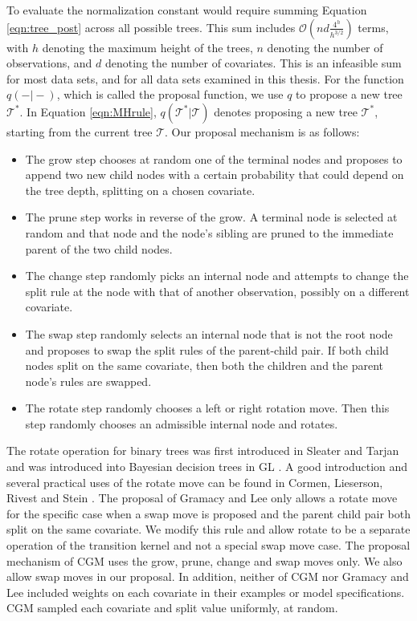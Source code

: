 To evaluate the normalization constant would require summing Equation \ref{eqn:tree_post} across all possible trees. This sum includes $\mathcal{O}(nd\frac{4^h}{h^{3/2}})$ terms, with $h$ denoting the maximum height of the trees, $n$ denoting the number of observations, and $d$ denoting the number of covariates. This is an infeasible sum for most data sets, and for all data sets examined in this thesis. For the function $q(-\vert-)$, which is called the proposal function, we use $q$ to propose a new tree $\mathcal{T}^*$.   
In Equation \ref{eqn:MHrule}, $q(\mathcal{T}^*\vert\mathcal{T})$ denotes proposing a new tree $\mathcal{T}^*$, starting from the current tree $\mathcal{T}$. 
 Our proposal mechanism is as follows:
  \begin{itemize}
 \item The grow step chooses at random one of the terminal nodes and proposes to append two new child nodes with a certain probability that could depend on the tree depth, splitting on a chosen covariate.
 \item The prune step works in reverse of the grow. A terminal node is selected at random and that node and the node's sibling are pruned to the immediate parent of the two child nodes.
 \item The change step randomly picks an internal node and attempts to change the split rule at the node with that of another observation, possibly on a different covariate.
  \item The swap step randomly selects an internal node that is not the root node and proposes to swap the split rules of the parent-child pair. If both child nodes split on the same covariate, then both the children and the parent node's rules are swapped.
  \item The rotate step randomly chooses a left or right rotation move. Then this step randomly chooses an admissible internal node and rotates.
 \end{itemize}
  The rotate operation for binary trees was first introduced in Sleater and Tarjan \cite{sleator1985self} and was introduced into Bayesian decision trees in GL \cite{gramacy2008bayesian}. A good introduction and several practical uses of the rotate move can be found in Cormen, Lieserson, Rivest and Stein \cite{cormen2001introduction}. The proposal of Gramacy and Lee \cite{gramacy2008bayesian} only allows a rotate move for the specific case when a swap move is proposed and the parent child pair both split on the same covariate. We modify this rule and allow rotate to be a separate operation of the transition kernel and not a special swap move case. The proposal mechanism of CGM uses the grow, prune, change and swap moves only. We also allow swap moves in our proposal. In addition, neither of CGM nor Gramacy and Lee \cite{gramacy2008bayesian} included weights on each covariate in their examples or model specifications. CGM sampled each covariate and split value uniformly, at random. 
  
